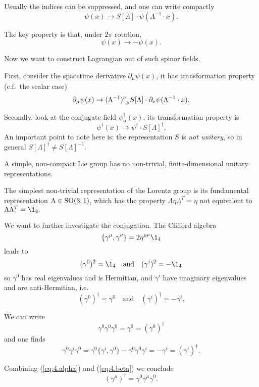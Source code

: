 \documentclass[a4paper,11pt]{article}
\begin{document}
	Usually the indices can be suppressed, and one can write compactly
		\[
			\psi(x) \to S[\Lambda] \cdot \psi(\Lambda^{-1} \cdot x).
		\]

	The key property is that, under $2 \pi$ rotation, 
	\[
		\psi(x) \to - \psi(x).
	\]
	
	Now we want to construct Lagrangian out of such spinor fields. 

	First, consider the spacetime derivative $\partial_\mu \psi(x)$, it has transformation property (c.f.\ the scalar case)
	\[
		\partial_\mu \psi(x) \to (\Lambda^{-1})\indices{^\nu_\mu} S[\Lambda]\cdot \partial_\nu \psi(\Lambda^{-1} \cdot x).
	\]
	 
	Secondly, look at the conjugate field $\psi^{\dagger}_\alpha(x)$, its transformation property is
	\begin{equation}
		\psi^{\dagger}(x) \to \psi^{\dagger} \cdot S[\Lambda]^{\dagger}.
		\label{eq:4.3.2}
	\end{equation}
	An important point to note here is: the representation $S$ is \emph{not unitary}, so in general $S[\Lambda]^{\dagger} \neq S[\Lambda]^{-1}$. 

	\begin{thm}
		A simple, non-compact Lie group has no non-trivial, finite-dimensional unitary representations.
	\end{thm}

	The simplest non-trivial representation of the Lorentz group is its fundamental representation $\Lambda \in \operatorname{SO}(3,1)$, which has the property $\Lambda \eta \Lambda^T = \eta$ not equivalent to $\Lambda \Lambda^T = \1_4.$
	
	We want to further investigate the conjugation. The Clifford algebra
	\[
		\{\gamma^\mu, \gamma^\nu\} = 2 \eta ^{\mu \nu} \1_4
	\]
	leads to 
	\[
		(\gamma^0)^2 = \1_4 \quad \text{and} \quad (\gamma^i)^2 = - \1_4
	\]
	so $\gamma^0$ has real eigenvalues and is Hermitian, and $\gamma^i$ have imaginary eigenvalues and are anti-Hermitian, i.e.\ 
	\[
		(\gamma^0)^{\dagger} = \gamma^0 \quad \text{and} \quad (\gamma^i)^{\dagger} = - \gamma^i.
	\]
	
	We can write
	\[
		\gamma^0 \gamma^0 \gamma^0 = \gamma^0 = (\gamma^0)^{\dagger}
		\tag{$\alpha$}
		\label{eq:4.alpha}
	\]
	and one finds
	\[
		\gamma^0 \gamma^i \gamma^0 = \gamma^0 \{\gamma^i, \gamma^0\} - \gamma^0 \gamma^0 \gamma^i = - \gamma^i = (\gamma^i)^{\dagger}.
		\tag{$\beta$}
		\label{eq:4.beta}
	\]
	
	Combining (\ref{eq:4.alpha}) and (\ref{eq:4.beta}) we conclude 
	\[
		(\gamma^\mu)^{\dagger} = \gamma^0 \gamma^\mu \gamma^0.
	\]
	
\end{document}

